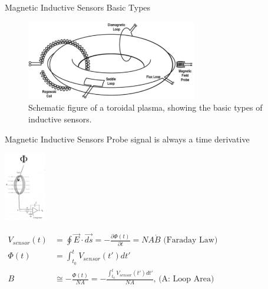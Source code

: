 \documentclass{beamer}
\begin{document}
\begin{frame}{Magnetic Inductive Sensors } {Basic Types}
	\begin{figure}[ht]
 	\begin{center}
	\includegraphics[height=3.5cm]{indsensors.png}
		\caption{\tiny Schematic figure of a toroidal plasma, showing the basic types of inductive sensors.}
	\end{center}
	\end{figure}
\end{frame}

\begin{frame}{Magnetic Inductive Sensors } {Probe signal is always a time derivative }
 	\begin{center}
	\includegraphics[trim = 1mm 25mm 3mm 5mm, clip, height=3cm]{magsensor.png}
	\end{center}
$
 \begin{array}{cl}
 V_{sensor} (t) &= \oint \vec{E} \cdot \vec{d s}  =
  - \frac{\partial \Phi(t)}{\partial t} = NA\dot{B}\textrm{  (Faraday Law)} \\
\Phi(t) &= \int_{t_0}^t V_{sensor}(t') d t' \\
B & \cong -  \frac{\Phi(t) } {NA}  =  -  \frac{\int_{t_0}^t V_{sensor}(t') d t' } {NA} \textrm{,   (A: Loop Area)}
\end{array}
$

\end{frame}
\end{document}
